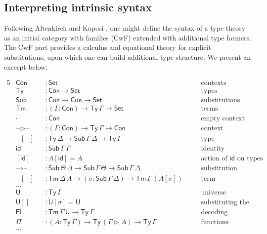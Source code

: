\documentclass[dvipsnames]{lmcs} %
\newcommand{\U}{\mathsf{U}}
\newcommand{\El}{\mathsf{El}}
\newcommand{\ra}{\rightarrow}
\newcommand{\Set}{\mathsf{Set}}
\newcommand{\Con}{\mathsf{Con}}
\newcommand{\Ty}{\mathsf{Ty}}
\newcommand{\Tm}{\mathsf{Tm}}
\newcommand{\Sub}{\mathsf{Sub}}
\newcommand{\id}{\mathsf{id}}
\newcommand{\blank}{\mathord{\hspace{1pt}\text{--}\hspace{1pt}}}
\newcommand{\1}{\mathsf{1}} \renewcommand{\Pr}{\mathsf{Pr}}
\theoremstyle{plain}\newtheorem{satz}[thm]{Satz} %
\begin{document}
\subsection{Interpreting intrinsic syntax}
Following Altenkirch and Kaposi \cite{ttintt}, one might define the syntax of a
type theory as an initial category with families (CwF) \cite{dybjer1995internal}
extended with additional type formers. The CwF part provides a calculus and
equational theory for explicit substitutions, upon which one can build
additional type structure. We present an excerpt below:

\begin{alignat*}{5}
  & \Con && : \Set && \text{contexts} \\
  & \Ty  && : \Con\ra\Set && \text{types} \\
  & \Sub  && : \Con\ra\Con\ra\Set && \text{substitutions} \\
  & \Tm  && : (\Gamma:\Con)\ra\Ty\,\Gamma\ra\Set \hspace{2em} && \text{terms} \\
  & \cdot && : \Con && \text{empty context} \\
  & \blank\rhd\blank && : (\Gamma:\Con)\ra\Ty\,\Gamma\ra\Con && \text{context extension} \\
  & \blank[\blank] && : \Ty\,\Delta\ra\Sub\,\Gamma\,\Delta\ra\Ty\,\Gamma && \text{type substitution} \\
  & \id && : \Sub\,\Gamma\,\Gamma && \text{identity substitution} \\
  & [\id] && : A[\id] = A && \text{action of}\,\,\id\,\,\text{on types}\\
  & \blank\circ\blank && : \Sub\,\Theta\,\Delta\ra\Sub\,\Gamma\,\Theta\ra\Sub\,\Gamma\,\Delta && \text{substitution composition} \\
  & \blank[\blank] && : \Tm\,\Delta\,A\ra(\sigma:\Sub\,\Gamma\,\Delta)\ra\Tm\,\Gamma\,(A[\sigma])\hspace{1em} && \text{term substitution} \\
  & ... && \\
  & \U && : \Ty\,\Gamma && \text{universe} \\
  & {\U[]} && : \U[\sigma] = \U && \text{substituting the universe} \\
  & \El && : \Tm\,\Gamma\,\U \ra \Ty\,\Gamma && \text{decoding} \\
  & \Pi && : (A:\Ty\,\Gamma)\ra\Ty\,(\Gamma\rhd A)\ra\Ty\,\Gamma && \text{functions} \\
  & ... &&
\end{alignat*}
\end{document}
